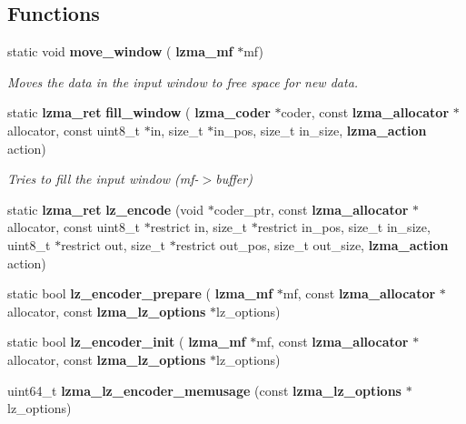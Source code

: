 \subsection*{Functions}
\begin{DoxyCompactItemize}
\item 
static void \textbf{ move\+\_\+window} (\textbf{ lzma\+\_\+mf} $\ast$mf)
\begin{DoxyCompactList}\small\item\em Moves the data in the input window to free space for new data. \end{DoxyCompactList}\item 
static \textbf{ lzma\+\_\+ret} \textbf{ fill\+\_\+window} (\textbf{ lzma\+\_\+coder} $\ast$coder, const \textbf{ lzma\+\_\+allocator} $\ast$allocator, const uint8\+\_\+t $\ast$in, size\+\_\+t $\ast$in\+\_\+pos, size\+\_\+t in\+\_\+size, \textbf{ lzma\+\_\+action} action)
\begin{DoxyCompactList}\small\item\em Tries to fill the input window (mf-\/$>$buffer) \end{DoxyCompactList}\item 
\mbox{\label{lz__encoder_8c_a7cbe9acd33a8d9006e85d00c60a448e9}} 
static \textbf{ lzma\+\_\+ret} {\bfseries lz\+\_\+encode} (void $\ast$coder\+\_\+ptr, const \textbf{ lzma\+\_\+allocator} $\ast$allocator, const uint8\+\_\+t $\ast$restrict in, size\+\_\+t $\ast$restrict in\+\_\+pos, size\+\_\+t in\+\_\+size, uint8\+\_\+t $\ast$restrict out, size\+\_\+t $\ast$restrict out\+\_\+pos, size\+\_\+t out\+\_\+size, \textbf{ lzma\+\_\+action} action)
\item 
\mbox{\label{lz__encoder_8c_ad7db5539ffefad96f82eee5547bfc50e}} 
static bool {\bfseries lz\+\_\+encoder\+\_\+prepare} (\textbf{ lzma\+\_\+mf} $\ast$mf, const \textbf{ lzma\+\_\+allocator} $\ast$allocator, const \textbf{ lzma\+\_\+lz\+\_\+options} $\ast$lz\+\_\+options)
\item 
\mbox{\label{lz__encoder_8c_ab95e6dd72dc5508f2c33fd1a695b556d}} 
static bool {\bfseries lz\+\_\+encoder\+\_\+init} (\textbf{ lzma\+\_\+mf} $\ast$mf, const \textbf{ lzma\+\_\+allocator} $\ast$allocator, const \textbf{ lzma\+\_\+lz\+\_\+options} $\ast$lz\+\_\+options)
\item 
\mbox{\label{lz__encoder_8c_aa3748d94a78e951b0a2f3e38c21e8049}} 
uint64\+\_\+t {\bfseries lzma\+\_\+lz\+\_\+encoder\+\_\+memusage} (const \textbf{ lzma\+\_\+lz\+\_\+options} $\ast$lz\+\_\+options)
\item 
\mbox{\label{lz__encoder_8c_a934bb8b94afb89859c915ef5d11bd7cd}} 

\end{DoxyCompactItemize}
